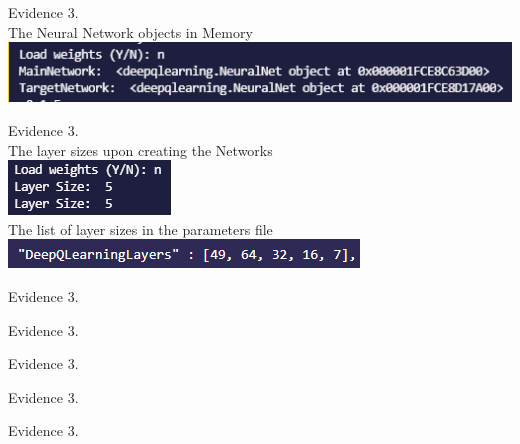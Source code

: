 \setcounter{magicrownumbers}{0}
\begin{center}
    {\large Evidence 3.\rn } \\ 
    \vspace{0.3cm}
    The Neural Network objects in Memory
    \includegraphics{Images/Testing/T3.1.1.PNG}
    \vspace{1cm}
    
    {\large Evidence 3.\rn } \\ 
    \vspace{0.3cm}
    The layer sizes upon creating the Networks \\
    \includegraphics{Images/Testing/T3.2.1.PNG} \\
    The list of layer sizes in the parameters file \\
    \includegraphics{Images/Testing/T3.2.2.PNG}
    \vspace{1cm}

    {\large Evidence 3.\rn } \\ 
    \vspace{0.3cm}
    \vspace{1cm}

    {\large Evidence 3.\rn } \\ 
    \vspace{0.3cm}
    \vspace{1cm}

    {\large Evidence 3.\rn } \\ 
    \vspace{0.3cm}
    \vspace{1cm}

    {\large Evidence 3.\rn } \\ 
    \vspace{0.3cm}
    \vspace{1cm}

    {\large Evidence 3.\rn } \\ 
    \vspace{0.3cm}
    \vspace{1cm}


\end{center}
